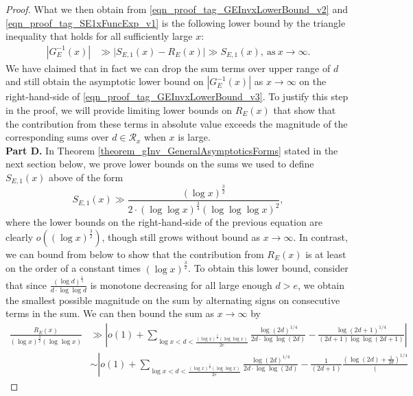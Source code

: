 \documentclass[11pt,reqno,a4letter]{article}
\numberwithin{figure}{section}
\numberwithin{table}{section}
\theoremstyle{plain}
\numberwithin{theorem}{section}
\theoremstyle{definition}
\begin{document}
\begin{proof}
What we then obtain from 
\eqref{eqn_proof_tag_GEInvxLowerBound_v2} and \eqref{eqn_proof_tag_SE1xFuncExp_v1} 
is the following lower bound by the triangle inequality 
that holds for all sufficiently large $x$: 
\begin{align} 
\label{eqn_proof_tag_GEInvxLowerBound_v3}
|G_E^{-1}(x)| & \gg 
     \Biggl\lvert S_{E,1}(x) - R_E(x) \Biggr\rvert \gg S_{E,1}(x), \mathrm{\ as\ } 
     x \rightarrow \infty. 
\end{align} 
We have claimed that in fact we can drop the sum terms over upper range of $d$ and still 
obtain the asymptotic lower bound on $|G_E^{-1}(x)|$ as $x \rightarrow \infty$ on the 
right-hand-side of \eqref{eqn_proof_tag_GEInvxLowerBound_v3}. 
To justify this step in the proof, 
we will provide limiting lower bounds on $R_E(x)$ that show that the 
contribution from these terms in absolute value exceeds the magnitude of the 
corresponding sums over $d \in \mathcal{R}_x$ when $x$ is large. \\ 
\textbf{Part D.} 
In Theorem \ref{theorem_gInv_GeneralAsymptoticsForms} stated in the next section below, 
we prove lower bounds on the sums we used to 
define $S_{E,1}(x)$ above of the form 
\[
S_{E,1}(x) \gg \frac{(\log x)^{\frac{3}{2}}}{2 \cdot  
     (\log\log x)^{\frac{3}{4}} (\log\log\log x)^2}, 
\]
where the lower bounds on the right-hand-side of the previous equation are clearly 
$o\left((\log x)^{\frac{3}{2}}\right)$, though still grows 
without bound as $x \rightarrow \infty$. 
In contrast, we can bound from below to show that the contribution from 
$R_E(x)$ is at least on the order of a constant 
times $(\log x)^{\frac{3}{2}}$. To obtain this lower bound, consider 
that since $\frac{(\log d)^{\frac{1}{4}}}{d \cdot \log\log d}$ 
is monotone decreasing for all large enough $d > e$, we obtain the smallest possible magnitude on the sum 
by alternating signs on consecutive terms in the sum. 
We can then bound the sum as $x \rightarrow \infty$ by 
\begin{align*} 
\frac{R_E(x)}{(\log x)^{\frac{3}{2}} (\log\log x)} & \gg 
     \left\lvert o(1) + 
     \sum_{\log x < d < \frac{(\log x)^{\frac{3}{2}} (\log\log x)}{2e}} 
     \frac{\log(2d)^{1/4}}{2d \cdot \log\log(2d)} - \frac{\log(2d+1)^{1/4}}{(2d+1) \log\log(2d+1)} 
     \right\rvert \\ 
     & \sim \left\lvert o(1) + 
     \sum_{\log x < d < \frac{(\log x)^{\frac{3}{2}} (\log\log x)}{2e}} 
     \frac{\log(2d)^{1/4}}{2d \cdot \log\log(2d)} - 
     \frac{1}{(2d+1)} \frac{\left(\log(2d) + \frac{1}{2d}\right)^{1/4}}{\left( 
}
\end{align*}
\end{proof}
\end{document}
